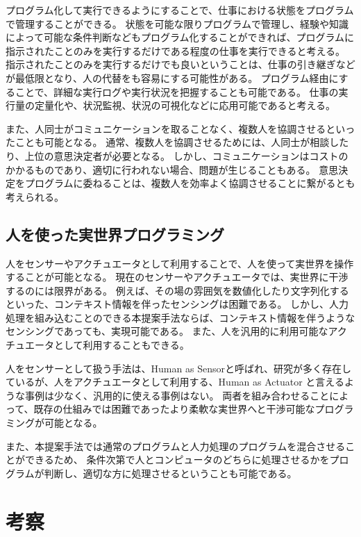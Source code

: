 \documentclass[twoside]{wiss}
\begin{document}
プログラム化して実行できるようにすることで、仕事における状態をプログラムで管理することができる。
状態を可能な限りプログラムで管理し、経験や知識によって可能な条件判断などもプログラム化することができれば、プログラムに指示されたことのみを実行するだけである程度の仕事を実行できると考える。
指示されたことのみを実行するだけでも良いということは、仕事の引き継ぎなどが最低限となり、人の代替をも容易にする可能性がある。
プログラム経由にすることで、詳細な実行ログや実行状況を把握することも可能である。
仕事の実行量の定量化や、状況監視、状況の可視化などに応用可能であると考える。

また、人同士がコミュニケーションを取ることなく、複数人を協調させるといったことも可能となる。
通常、複数人を協調させるためには、人同士が相談したり、上位の意思決定者が必要となる。
しかし、コミュニケーションはコストのかかるものであり、適切に行われない場合、問題が生じることもある。
意思決定をプログラムに委ねることは、複数人を効率よく協調させることに繋がるとも考えられる。


\subsection{人を使った実世界プログラミング}

人をセンサーやアクチュエータとして利用することで、人を使って実世界を操作することが可能となる。
現在のセンサーやアクチュエータでは、実世界に干渉するのには限界がある。
例えば、その場の雰囲気を数値化したり文字列化するといった、コンテキスト情報を伴ったセンシングは困難である。
しかし、人力処理を組み込むことのできる本提案手法ならば、コンテキスト情報を伴うようなセンシングであっても、実現可能である。
また、人を汎用的に利用可能なアクチュエータとして利用することもできる。

人をセンサーとして扱う手法は、Human as Sensorと呼ばれ、研究が多く存在しているが、人をアクチュエータとして利用する、Human as Actuator と言えるような事例は少なく、汎用的に使える事例はない。
両者を組み合わせることによって、既存の仕組みでは困難であったより柔軟な実世界へと干渉可能なプログラミングが可能となる。

また、本提案手法では通常のプログラムと人力処理のプログラムを混合させることができるため、
条件次第で人とコンピュータのどちらに処理させるかをプログラムが判断し、適切な方に処理させるということも可能である。


\section{考察}
\end{document}
